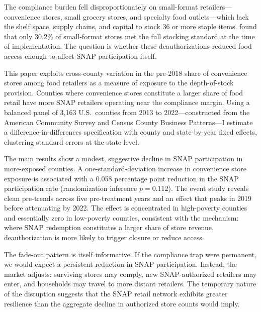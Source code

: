 \documentclass[12pt]{article}
\begin{document}
The compliance burden fell disproportionately on small-format retailers---convenience stores, small grocery stores, and specialty food outlets---which lack the shelf space, supply chains, and capital to stock 36 or more staple items. \citet{andreyeva2019dietary} found that only 30.2\% of small-format stores met the full stocking standard at the time of implementation. The question is whether these deauthorizations reduced food access enough to affect SNAP participation itself.

This paper exploits cross-county variation in the pre-2018 share of convenience stores among food retailers as a measure of exposure to the depth-of-stock provision. Counties where convenience stores constitute a larger share of food retail have more SNAP retailers operating near the compliance margin. Using a balanced panel of 3,163 U.S.\ counties from 2013 to 2022---constructed from the American Community Survey and Census County Business Patterns---I estimate a difference-in-differences specification with county and state-by-year fixed effects, clustering standard errors at the state level.

The main results show a modest, suggestive decline in SNAP participation in more-exposed counties. A one-standard-deviation increase in convenience store exposure is associated with a 0.058 percentage point reduction in the SNAP participation rate (randomization inference $p = 0.112$). The event study reveals clean pre-trends across five pre-treatment years and an effect that peaks in 2019 before attenuating by 2022. The effect is concentrated in high-poverty counties and essentially zero in low-poverty counties, consistent with the mechanism: where SNAP redemption constitutes a larger share of store revenue, deauthorization is more likely to trigger closure or reduce access.

The fade-out pattern is itself informative. If the compliance trap were permanent, we would expect a persistent reduction in SNAP participation. Instead, the market adjusts: surviving stores may comply, new SNAP-authorized retailers may enter, and households may travel to more distant retailers. The temporary nature of the disruption suggests that the SNAP retail network exhibits greater resilience than the aggregate decline in authorized store counts would imply.
\end{document}
